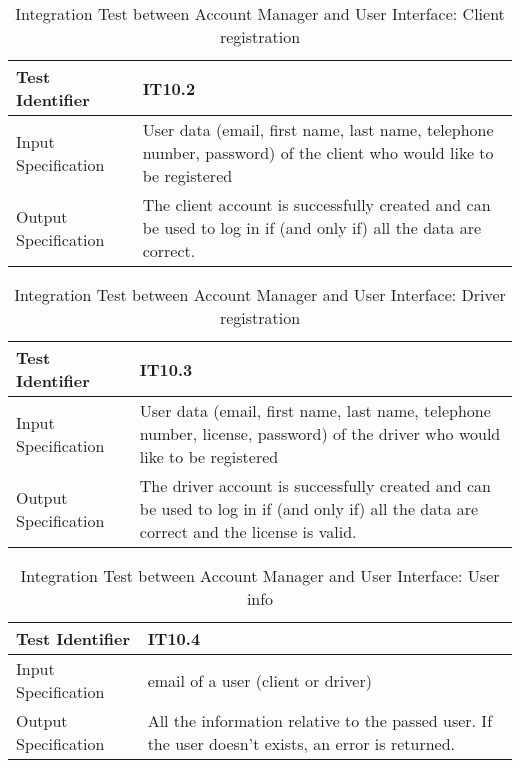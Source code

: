 \documentclass[a4paper]{article}
\begin{document}
\begin{table} [H]
\begin{center}
\begin{tabular}{| L | p{\rightcol} |}
  \hline
  Test Identifier & IT10.2 \\
  \hline
  Input Specification & User data (email, first name, last name, telephone number, password) of the client who would like to be registered\\
  \hline
  Output Specification & The client account is successfully created and can be used to log in if (and only if) all the data are correct.\\
  \hline
\end{tabular}
\end{center}
\caption{Integration Test between Account Manager and User Interface: Client registration}
\end{table}

\begin{table} [H]
\begin{center}
\begin{tabular}{| L | p{\rightcol} |}
  \hline
  Test Identifier & IT10.3 \\
  \hline
  Input Specification & User data (email, first name, last name, telephone number, license, password) of the driver who would like to be registered\\
  \hline
  Output Specification & The driver account is successfully created and can be used to log in  if (and only if) all the data are correct and the license is valid.\\
  \hline
\end{tabular}
\end{center}
\caption{Integration Test between Account Manager and User Interface: Driver registration}
\end{table}

\begin{table} [H]
\begin{center}
\begin{tabular}{| L | p{\rightcol} |}
  \hline
  Test Identifier & IT10.4 \\
  \hline
  Input Specification & email of a user (client or driver)\\
  \hline
  Output Specification & All the information relative to the passed user. If the user doesn't exists, an error is returned.\\
  \hline
\end{tabular}
\end{center}
\caption{Integration Test between Account Manager and User Interface: User info}
\end{table}
\end{document}
